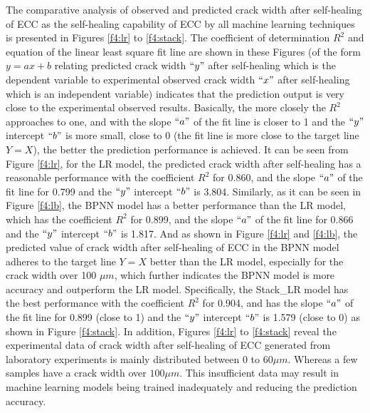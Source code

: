 \documentclass[11pt]{article}
\begin{document}
	The comparative analysis of observed and predicted crack width after self-healing of ECC as the self-healing capability of ECC by all machine learning techniques is presented in Figures \ref{f4:lr} to \ref{f4:stack}. The coefficient of determination $R^2$ and equation of the linear least square fit line are shown in these Figures (of the form $y = ax +b$ relating predicted crack width $``y"$ after self-healing which is the dependent variable to experimental observed crack width $``x"$ after self-healing which is an independent variable) indicates that the prediction output is very close to the experimental observed results. Basically, the more closely the $R^2$ approaches to one, and with the slope $``a"$ of the fit line is closer to 1 and the $``y"$ intercept $``b"$ is more small, close to 0 (the fit line is more close to the target line $Y = X$), the better the prediction performance is achieved. It can be seen from Figure \ref{f4:lr}, for the LR model, the predicted crack width after self-healing has a reasonable performance with the coefficient $R^2$ for 0.860, and the slope $``a"$ of the fit line for 0.799 and the $``y"$ intercept $``b"$ is 3.804. Similarly, as it can be seen in Figure \ref{f4:lb}, the BPNN model has a better performance than the LR model, which has the coefficient $R^2$ for 0.899, and the slope $``a"$ of the fit line for 0.866 and the $``y"$ intercept $``b"$ is 1.817. And as shown in Figure \ref{f4:lr} and \ref{f4:lb}, the predicted value of crack width after self-healing of ECC in the BPNN model adheres to the target line $Y = X$ better than the LR model, especially for the crack width over 100 $\mu m$, which further indicates the BPNN model is more accuracy and outperform the LR model.  Specifically, the Stack\_LR model has the best performance with the coefficient $R^2$ for 0.904, and has the slope $``a"$ of the fit line for 0.899 (close to 1) and the $``y"$ intercept $``b"$ is 1.579 (close to 0) as shown in Figure \ref{f4:stack}. In addition, Figures \ref{f4:lr} to \ref{f4:stack} reveal the experimental data of crack width after self-healing of ECC generated from laboratory experiments is mainly distributed between $0$ to $60 \mu m$. Whereas a few samples have a crack width over $100 \mu m$.  This insufficient data may result in machine learning models being trained inadequately and reducing the prediction accuracy.  
	
\end{document}
